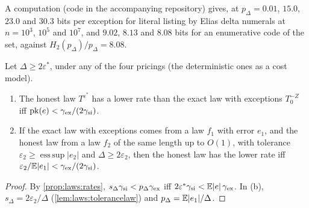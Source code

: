 A computation (code in the accompanying repository) gives, at $p_\Delta=0.01$, $15.0$, $23.0$ and $30.3$ bits per exception for literal listing by Elias delta numerals at $n=10^3$, $10^5$ and $10^7$, and $9.02$, $8.13$ and $8.08$ bits for an enumerative code of the set, against $H_2(p_\Delta)/p_\Delta=8.08$.

\begin{proposition}\label{prop:laws:peaked}
Let $\Delta\ge2\varepsilon^*$, under any of the four pricings (the deterministic ones as a cost model).
\begin{enumerate}[label=(\alph*),itemsep=1pt,topsep=2pt]
\item The honest law $T^{\varepsilon^*}$ has a lower rate than the exact law with exceptions $T_0^{-Z}$ iff $\mathrm{pk}(e)<\gamma_{\rm ex}/(2\gamma_{\rm si})$.
\item If the exact law with exceptions comes from a law $f_1$ with error $e_1$, and the honest law from a law $f_2$ of the same length up to $O(1)$, with tolerance $\varepsilon_2\ge\operatorname{ess\,sup}\lvert e_2\rvert$ and $\Delta\ge2\varepsilon_2$, then the honest law has the lower rate iff $\varepsilon_2/\mathbb{E}\lvert e_1\rvert<\gamma_{\rm ex}/(2\gamma_{\rm si})$.
\end{enumerate}
\end{proposition}

\begin{proof}
By \cref{prop:laws:rates}, $s_\Delta\gamma_{\rm si}<p_\Delta\gamma_{\rm ex}$ iff $2\varepsilon^*\gamma_{\rm si}<\mathbb{E}\lvert e\rvert\,\gamma_{\rm ex}$. In (b), $s_\Delta=2\varepsilon_2/\Delta$ (\cref{lem:laws:tolerancelaw}) and $p_\Delta=\mathbb{E}\lvert e_1\rvert/\Delta$.
\end{proof}

